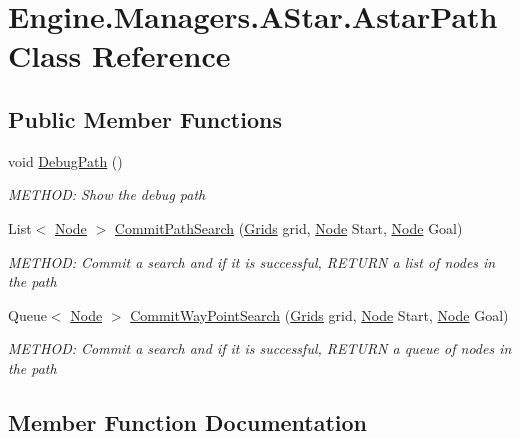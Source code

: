 \hypertarget{a00310}{}\section{Engine.\+Managers.\+A\+Star.\+Astar\+Path Class Reference}
\label{a00310}
\subsection*{Public Member Functions}
\begin{DoxyCompactItemize}
\item 
void \hyperlink{a00310_a9912ab7f4be1ca36bc9b7e7081c5dd86}{Debug\+Path} ()
\begin{DoxyCompactList}\small\item\em M\+E\+T\+H\+OD\+: Show the debug path \end{DoxyCompactList}\item 
List$<$ \hyperlink{a00414}{Node} $>$ \hyperlink{a00310_aaa05e962c6e833ff7e22c4611ee492c7}{Commit\+Path\+Search} (\hyperlink{a00406}{Grids} grid, \hyperlink{a00414}{Node} Start, \hyperlink{a00414}{Node} Goal)
\begin{DoxyCompactList}\small\item\em M\+E\+T\+H\+OD\+: Commit a search and if it is successful, R\+E\+T\+U\+RN a list of nodes in the path \end{DoxyCompactList}\item 
Queue$<$ \hyperlink{a00414}{Node} $>$ \hyperlink{a00310_a1d55b6294c95c398017c25655bc4604f}{Commit\+Way\+Point\+Search} (\hyperlink{a00406}{Grids} grid, \hyperlink{a00414}{Node} Start, \hyperlink{a00414}{Node} Goal)
\begin{DoxyCompactList}\small\item\em M\+E\+T\+H\+OD\+: Commit a search and if it is successful, R\+E\+T\+U\+RN a queue of nodes in the path \end{DoxyCompactList}\end{DoxyCompactItemize}


\subsection{Member Function Documentation}
\mbox{\label{a00310_aaa05e962c6e833ff7e22c4611ee492c7}} 
